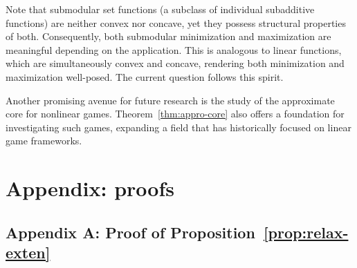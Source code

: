 \documentclass[11pt]{article}\usepackage[]{graphicx}\usepackage[]{xcolor}
\begin{document}
\begin{enumerate}[(i)]
Note that submodular set functions (a subclass of individual subadditive functions) are neither convex nor concave, yet they possess structural properties of both. Consequently, both submodular minimization and maximization are meaningful depending on the application. This is analogous to linear functions, which are simultaneously convex and concave, rendering both minimization and maximization well-posed. The current question follows this spirit. 


\end{enumerate}

Another promising avenue for future research is the study of the approximate core for nonlinear games. 
Theorem~\ref{thm:appro-core} also offers a foundation for investigating such games, expanding a field that has historically focused on linear game frameworks.








\section{Appendix: proofs}

\subsection{Appendix A: Proof of Proposition~\ref{prop:relax-exten}}
\end{document}
